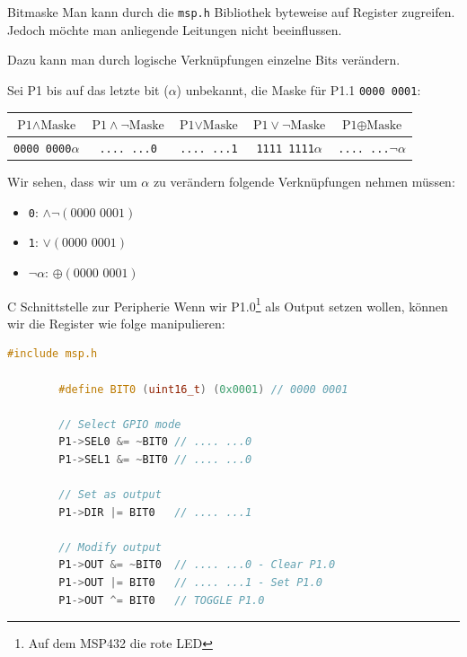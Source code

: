 \begin{bonus}{Bitmaske}
    Man kann durch die \texttt{msp.h} Bibliothek byteweise auf Register zugreifen.
    Jedoch möchte man anliegende Leitungen nicht beeinflussen.

    Dazu kann man durch logische Verknüpfungen einzelne Bits verändern.

    Sei P1 bis auf das letzte bit (\texttt{$\alpha$}) unbekannt, die Maske für P1.1 \texttt{0000 0001}:

    \begin{center}
        \begin{tabular}{|c|c|c|c|c|}
            \hline
            $\text{P1} \land \text{Maske}$ & $\text{P1} \land \lnot \text{Maske}$ & $\text{P1} \lor \text{Maske}$ & $\text{P1} \lor \lnot \text{Maske}$ & $\text{P1} \oplus \text{Maske}$ \\\hline\hline
            \texttt{0000 0000$\alpha$}     & \texttt{.... ...0}                   & \texttt{.... ...1}            & \texttt{1111 1111$\alpha$}          & \texttt{.... ...$\lnot \alpha$} \\\hline
        \end{tabular}
    \end{center}

    Wir sehen, dass wir um $\alpha$ zu verändern folgende Verknüpfungen nehmen müssen:
    \begin{itemize}
        \item \texttt{0}: $\land \lnot (\text{0000 0001})$
        \item \texttt{1}: $\lor (\text{0000 0001})$
        \item \texttt{$\lnot \alpha$}: $\oplus (\text{0000 0001})$
    \end{itemize}
\end{bonus}

\begin{example}{C Schnittstelle zur Peripherie}
    Wenn wir P1.0\footnote{Auf dem MSP432 die rote LED} als Output setzen wollen, können wir die Register wie folge manipulieren:

    \begin{lstlisting}[language=c]
        #include msp.h

        #define BIT0 (uint16_t) (0x0001) // 0000 0001

        // Select GPIO mode
        P1->SEL0 &= ~BIT0 // .... ...0
        P1->SEL1 &= ~BIT0 // .... ...0

        // Set as output
        P1->DIR |= BIT0   // .... ...1

        // Modify output
        P1->OUT &= ~BIT0  // .... ...0 - Clear P1.0
        P1->OUT |= BIT0   // .... ...1 - Set P1.0
        P1->OUT ^= BIT0   // TOGGLE P1.0
    \end{lstlisting}
\end{example}

